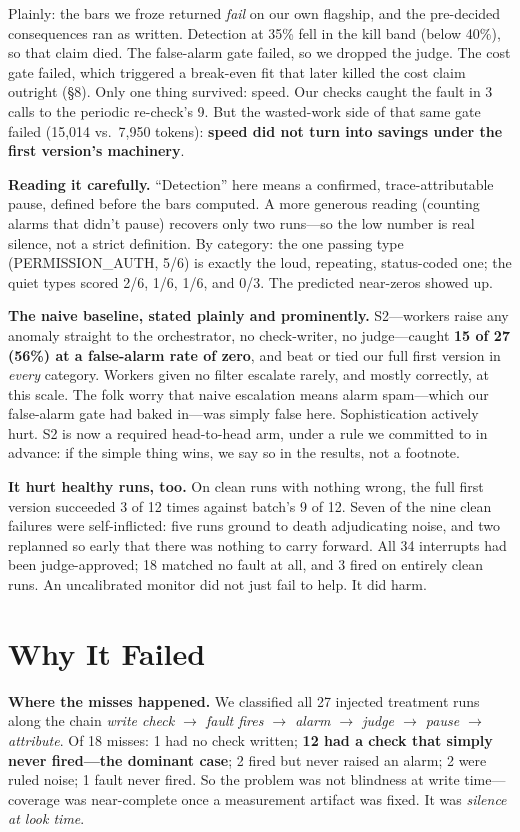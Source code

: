 \documentclass[acmsmall,screen]{acmart}
\begin{document}
Plainly: the bars we froze returned \emph{fail} on our own flagship, and the
pre-decided consequences ran as written. Detection at 35\% fell in the kill
band (below 40\%), so that claim died. The false-alarm gate failed, so we
dropped the judge. The cost gate failed, which triggered a break-even fit that
later killed the cost claim outright (\S8). Only one thing survived: speed. Our
checks caught the fault in 3 calls to the periodic re-check's 9. But the
wasted-work side of that same gate failed (15,014 vs.\ 7,950 tokens):
\textbf{speed did not turn into savings under the first version's machinery}.

\textbf{Reading it carefully.} ``Detection'' here means a confirmed,
trace-attributable pause, defined before the bars computed. A more generous
reading (counting alarms that didn't pause) recovers only two runs---so the low
number is real silence, not a strict definition. By category: the one passing
type (PERMISSION\_AUTH, 5/6) is exactly the loud, repeating, status-coded one;
the quiet types scored 2/6, 1/6, 1/6, and 0/3. The predicted near-zeros showed
up.

\textbf{The naive baseline, stated plainly and prominently.} S2---workers raise
any anomaly straight to the orchestrator, no check-writer, no judge---caught
\textbf{15 of 27 (56\%) at a false-alarm rate of zero}, and beat or tied our
full first version in \emph{every} category. Workers given no filter escalate
rarely, and mostly correctly, at this scale. The folk worry that naive
escalation means alarm spam---which our false-alarm gate had baked in---was
simply false here. Sophistication actively hurt. S2 is now a required
head-to-head arm, under a rule we committed to in advance: if the simple thing
wins, we say so in the results, not a footnote.

\textbf{It hurt healthy runs, too.} On clean runs with nothing wrong, the full
first version succeeded 3 of 12 times against batch's 9 of 12. Seven of the nine
clean failures were self-inflicted: five runs ground to death adjudicating
noise, and two replanned so early that there was nothing to carry forward. All
34 interrupts had been judge-approved; 18 matched no fault at all, and 3 fired
on entirely clean runs. An uncalibrated monitor did not just fail to help. It
did harm.

\section{Why It Failed}
\textbf{Where the misses happened.} We classified all 27 injected treatment
runs along the chain \emph{write check $\rightarrow$ fault fires $\rightarrow$
alarm $\rightarrow$ judge $\rightarrow$ pause $\rightarrow$ attribute}. Of 18
misses: 1 had no check written; \textbf{12 had a check that simply never
fired---the dominant case}; 2 fired but never raised an alarm; 2 were ruled
noise; 1 fault never fired. So the problem was not blindness at write
time---coverage was near-complete once a measurement artifact was fixed. It was
\emph{silence at look time}.
\end{document}
